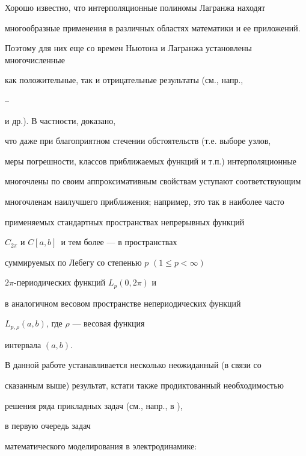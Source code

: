 Хорошо известно, что интерполяционные полиномы Лагранжа находят


многообразные применения в различных областях математики и ее приложений.


Поэтому для них еще со времен Ньютона и Лагранжа установлены многочисленные


как положительные, так и отрицательные результаты (см., напр.,


\cite{Nat}--\cite{Pri}


и др.). В частности, доказано,


что даже при благоприятном стечении обстоятельств (т.е. выборе узлов,


меры погрешности, классов приближаемых функций и т.п.) интерполяционные


многочлены по своим аппроксимативным свойствам уступают соответствующим


многочленам наилучшего приближения; например, это так в наиболее часто


применяемых стандартных пространствах непрерывных функций


$C_{2\pi }$ и $C[a,b]\, $ и тем более --- в пространствах


суммируемых по Лебегу со степенью $p$ $(1\le p<\infty )$


$2\pi $-периодических функций $L_{p}(0,2\pi )$ и


в аналогичном весовом пространстве непериодических функций


$L_{p,\rho }(a,b)$, где $\rho$ --- весовая функция


интервала $(a,b)$.





В данной работе устанавливается несколько неожиданный (в связи со


сказанным выше) результат, кстати также продиктованный необходимостью


решения ряда прикладных задач (см., напр., в \cite{Gab1}),


в первую очередь задач


математического моделирования в электродинамике:







